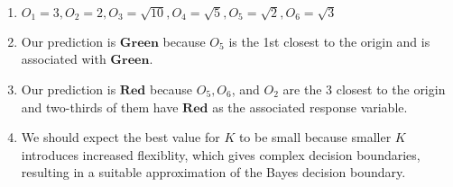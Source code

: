 \documentclass[11pt]{article}
\begin{document}
\begin{enumerate}
{	\begin{enumerate}
	
		\item{$O_1 = 3, O_2 = 2, O_3 = \sqrt{10}, O_4 = \sqrt{5}, O_5 = \sqrt{2}, O_6 = \sqrt{3}$}
		\item{Our prediction is $\mathbf{Green}$ because $O_5$ is the 1st closest to the origin and is associated with $\mathbf{Green}$.}
		\item{Our prediction is $\mathbf{Red}$ because $O_5, O_6$, and $O_2$ are the 3 closest to the origin and two-thirds of them have $\mathbf{Red}$ as the associated response variable.}
		\item{We should expect the best value for $K$ to be small because smaller $K$ introduces increased flexiblity, which gives complex decision boundaries, resulting in a suitable approximation of the Bayes decision boundary.}
	\end{enumerate}
	
	}

\end{enumerate}
\end{document}
